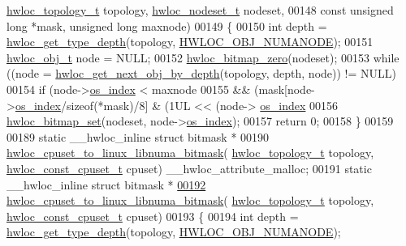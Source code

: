 \begin{DoxyCode}
      \hyperlink{a00186_ga9d1e76ee15a7dee158b786c30b6a6e38}{hwloc\_topology\_t} topology, \hyperlink{a00183_ga37e35730fa7e775b5bb0afe893d6d508}{hwloc\_nodeset\_t} nodeset,
00148                                         \textcolor{keyword}{const} \textcolor{keywordtype}{unsigned} \textcolor{keywordtype}{long} *mask, \textcolor{keywordtype}{unsigned} \textcolor{keywordtype}{long} maxnode)
00149 \{
00150   \textcolor{keywordtype}{int} depth = \hyperlink{a00187_ga8bec782e21be313750da70cf7428b374}{hwloc\_get\_type\_depth}(topology, 
      \hyperlink{a00184_ggacd37bb612667dc437d66bfb175a8dc55a9d917a3e5497950c6d8948b8e183db5a}{HWLOC\_OBJ\_NUMANODE});
00151   \hyperlink{a00238}{hwloc\_obj\_t} node = NULL;
00152   \hyperlink{a00205_gaa97c5217613c8cae9862287170ea2132}{hwloc\_bitmap\_zero}(nodeset);
00153   \textcolor{keywordflow}{while} ((node = \hyperlink{a00187_gac140a9b939d9fa0b30c4a910efcb0656}{hwloc\_get\_next\_obj\_by\_depth}(topology, depth, node)) != NULL)
00154     \textcolor{keywordflow}{if} (node->\hyperlink{a00238_a61a7a80a68eaccbaaa28269e678c81a9}{os\_index} < maxnode
00155         && (mask[node->\hyperlink{a00238_a61a7a80a68eaccbaaa28269e678c81a9}{os\_index}/\textcolor{keyword}{sizeof}(*mask)/8] & (1UL << (node->
      \hyperlink{a00238_a61a7a80a68eaccbaaa28269e678c81a9}{os\_index} %
00156       \hyperlink{a00205_ga062dbff93baeff3b425a7260c5463646}{hwloc\_bitmap\_set}(nodeset, node->\hyperlink{a00238_a61a7a80a68eaccbaaa28269e678c81a9}{os\_index});
00157   \textcolor{keywordflow}{return} 0;
00158 \}
00159 
00189 \textcolor{keyword}{static} \_\_hwloc\_inline \textcolor{keyword}{struct }bitmask *
00190 \hyperlink{a00216_gad8769b4544c0aeef154fc8223144e343}{hwloc\_cpuset\_to\_linux\_libnuma\_bitmask}(
      \hyperlink{a00186_ga9d1e76ee15a7dee158b786c30b6a6e38}{hwloc\_topology\_t} topology, \hyperlink{a00183_ga1f784433e9b606261f62d1134f6a3b25}{hwloc\_const\_cpuset\_t} cpuset) 
      \_\_hwloc\_attribute\_malloc;
00191 \textcolor{keyword}{static} \_\_hwloc\_inline \textcolor{keyword}{struct }bitmask *
\hyperlink{a00216_gad8769b4544c0aeef154fc8223144e343}{00192} \hyperlink{a00216_gad8769b4544c0aeef154fc8223144e343}{hwloc\_cpuset\_to\_linux\_libnuma\_bitmask}(
      \hyperlink{a00186_ga9d1e76ee15a7dee158b786c30b6a6e38}{hwloc\_topology\_t} topology, \hyperlink{a00183_ga1f784433e9b606261f62d1134f6a3b25}{hwloc\_const\_cpuset\_t} cpuset)
00193 \{
00194   \textcolor{keywordtype}{int} depth = \hyperlink{a00187_ga8bec782e21be313750da70cf7428b374}{hwloc\_get\_type\_depth}(topology, 
      \hyperlink{a00184_ggacd37bb612667dc437d66bfb175a8dc55a9d917a3e5497950c6d8948b8e183db5a}{HWLOC\_OBJ\_NUMANODE});

\end{DoxyCode}
